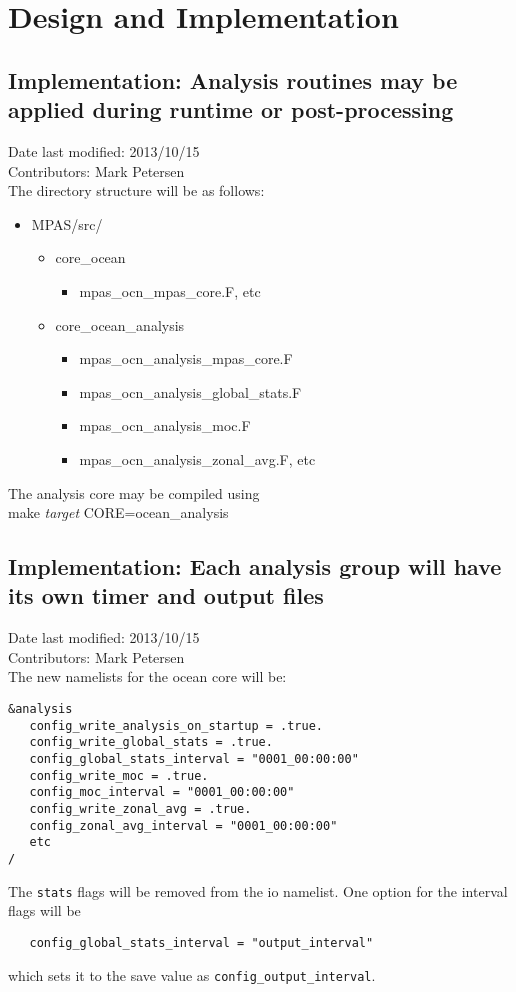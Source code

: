 \documentclass[11pt]{report}
\begin{document}


\chapter{Design and Implementation}

\section{Implementation: Analysis routines may be applied during runtime or post-processing}
Date last modified: 2013/10/15 \\
Contributors: Mark Petersen \\

The directory structure will be as follows:
\begin{itemize}
\item MPAS/src/
\begin{itemize}
\item core\_ocean
\begin{itemize}
\item mpas\_ocn\_mpas\_core.F, etc
\end{itemize}
\item core\_ocean\_analysis
\begin{itemize}
\item mpas\_ocn\_analysis\_mpas\_core.F
\item mpas\_ocn\_analysis\_global\_stats.F
\item mpas\_ocn\_analysis\_moc.F
\item mpas\_ocn\_analysis\_zonal\_avg.F, etc
\end{itemize}
\end{itemize}
\end{itemize}

The analysis core may be compiled using\\
make {\it target} CORE=ocean\_analysis

\newpage
\section{Implementation: Each analysis group will have its own timer and output files}
Date last modified: 2013/10/15 \\
Contributors: Mark Petersen \\

The new namelists for the ocean core will be:
\begin{verbatim}
&analysis
   config_write_analysis_on_startup = .true.
   config_write_global_stats = .true.
   config_global_stats_interval = "0001_00:00:00"
   config_write_moc = .true.
   config_moc_interval = "0001_00:00:00"
   config_write_zonal_avg = .true.
   config_zonal_avg_interval = "0001_00:00:00"
   etc
/
\end{verbatim}
The \verb|stats| flags will be removed from the io namelist.  One option for the interval flags will be 
\begin{verbatim}
   config_global_stats_interval = "output_interval"
\end{verbatim}
which sets it to the save value as \verb|config_output_interval|.
\end{document}

